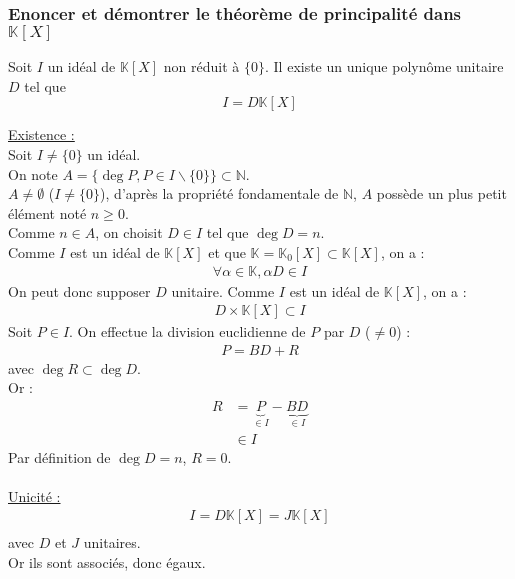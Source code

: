 \documentclass[titlepage, twoside]{report}
\begin{document}
\subsubsection{Enoncer et démontrer le théorème de principalité dans $\mathbb{K}[X]$}
\begin{tcolorbox}[title=Théorème 16.15, title filled=false, colframe=orange, colback=orange!10!white]
    Soit $I$ un idéal de $\mathbb{K}[X]$ non réduit à $\{0\}$. Il existe un unique polynôme unitaire $D$ tel que
    $$I = D \mathbb{K}[X]$$
\end{tcolorbox}

\noindent \underline{Existence :} \\
Soit $I \neq \{0\}$ un idéal. \\
On note $A = \{ \deg P, P \in I\backslash \{0\} \} \subset \mathbb{N}$. \\
$A \neq \emptyset$ ($I \neq \{0\}$), d'après la propriété fondamentale de $\mathbb{N}$, $A$ possède un plus petit élément noté $n \geq 0$. \\
Comme $n \in A$, on choisit $D \in I$ tel que $\deg D = n$. \\
Comme $I$ est un idéal de $\mathbb{K}[X]$ et que $\mathbb{K} = \mathbb{K}_0[X] \subset \mathbb{K}[X]$, on a : 
\begin{align*}
    \forall \alpha \in \mathbb{K}, \alpha D \in I
\end{align*}
On peut donc supposer $D$ unitaire. 
Comme $I$ est un idéal de $\mathbb{K}[X]$, on a : 
\begin{align*}
    D \times \mathbb{K}[X] \subset I
\end{align*}
Soit $P \in I$. On effectue la division euclidienne de $P$ par $D$ ($\neq 0$) : 
\begin{align*}
    P = BD + R
\end{align*}
avec $\deg R \subset \deg D$. \\
Or : 
\begin{align*}
    R &= \underbrace{P}_{\in I} - \underbrace{BD}_{\in I} \\
    &\in I
\end{align*}
Par définition de $\deg D = n$, $R = 0$. \\ \\

\noindent \underline{Unicité :} \\
\begin{align*}
    I = D \mathbb{K}[X] = J \mathbb{K}[X] \\
\end{align*}
avec $D$ et $J$ unitaires. \\
Or ils sont associés, donc égaux. 
\end{document}
